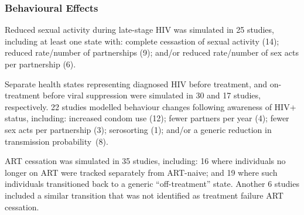 \subsubsection{Behavioural Effects}\label{sr.res.f.behav}
Reduced sexual activity during late-stage HIV was simulated in 25 studies,
including at least one state with:
complete cessastion of sexual activity (14);
reduced rate/number of partnerships (9); and/or
reduced rate/number of sex acts per partnership (6).
\par
Separate health states representing diagnosed HIV before treatment,
and on-treatment before viral suppression were simulated in
30 and 17 studies, respectively.
22 studies modelled behaviour changes following awareness of HIV+ status, including:
increased condom use (12);
fewer partners per year (4);
fewer sex acts per partnership (3);
serosorting (1); and/or
a generic reduction in transmission probability~(8).
\par
ART cessation was simulated in 35 studies, including:
16 where individuals no longer on ART were tracked separately from ART-naive; and
19 where such individuals transitioned back to a generic ``off-treatment'' state.
Another 6 studies included a similar transition
that was not identified as treatment failure \vs ART cessation.
